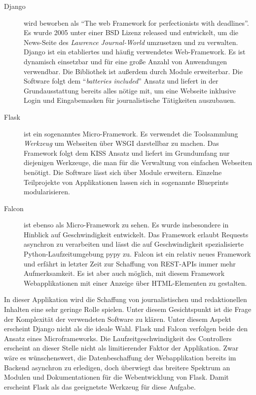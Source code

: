 \begin{description}
 \item [Django] wird beworben als "`The web \gls{Framework}  for perfectionists with dead\-lines"'. Es wurde 2005 unter einer BSD Lizenz released und entwickelt, um die News-Seite des \textit{Lawrence Journal-World} umzusetzen und zu verwalten. Django ist ein etabliertes und häufig verwendetes Web-Framework. Es ist dynamisch einsetzbar und für eine große Anzahl von Anwendungen verwendbar. Die Bibliothek ist außerdem durch Module erweiterbar. Die Software folgt dem "`\textit{batteries included}"' Ansatz und liefert in der Grundausstattung bereits alles nötige mit, um eine Webseite inklusive Login und Eingabemasken für journalistische Tätigkeiten auszubauen.

 \item [Flask] ist ein sogenanntes Micro-\gls{Framework}. Es verwendet die Toolsammlung \textit{Werkzeug} um Webseiten über \gls{WSGI} darstellbar zu machen. Das \gls{Framework} folgt dem \gls{KISS} Ansatz und liefert im Grundumfang nur diejenigen Werkzeuge, die man für die Verwaltung von einfachen Webseiten benötigt. Die Software lässt sich über Module erweitern. Einzelne Teilprojekte von Applikationen lassen sich in sogenannte Blueprints modularisieren.

 \item [Falcon] ist ebenso als Micro-\gls{Framework} zu sehen. Es wurde insbesondere in Hinblick auf Geschwindigkeit entwickelt. Das \gls{Framework} erlaubt Requests asynchron zu verarbeiten und lässt die auf Geschwindigkeit spezialisierte Python-Laufzeitumgebung pypy zu. Falcon ist ein relativ neues \gls{Framework} und erfährt in letzter Zeit zur Schaffung von REST-APIs immer mehr Aufmerksamkeit. Es ist aber auch möglich, mit diesem \gls{Framework} Webapplikationen mit einer Anzeige über HTML-Elementen zu gestalten.
\end{description}

In dieser Applikation wird die Schaffung von journalistischen und redaktionellen Inhalten eine sehr geringe Rolle spielen. Unter diesem Gesichtspunkt ist die Frage der Komplexität der verwendeten Software zu klären. Unter diesem Aspekt erscheint Django nicht als die ideale Wahl.
Flask und Falcon verfolgen beide den Ansatz eines Microframeworks. Die Laufzeitgeschwindigkeit des \gls{Controller}s erscheint an dieser Stelle nicht als limitierender Faktor der Applikation. Zwar wäre es wünschenswert, die Datenbeschaffung der Webapplikation bereits im Backend asynchron zu erledigen, doch überwiegt das breitere Spektrum an Modulen und Dokumentationen für die Webentwicklung von Flask.
Damit erscheint Flask als das geeignetste Werkzeug für diese Aufgabe.


